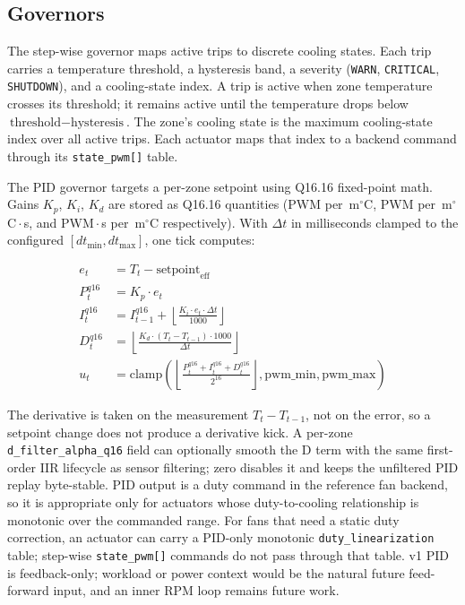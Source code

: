 \subsection{Governors}

The step-wise governor maps active trips to discrete cooling states. Each trip carries a temperature threshold, a hysteresis band, a severity (\texttt{WARN}, \texttt{CRITICAL}, \texttt{SHUTDOWN}), and a cooling-state index. A trip is active when zone temperature crosses its threshold; it remains active until the temperature drops below \(\text{threshold} - \text{hysteresis}\). The zone's cooling state is the maximum cooling-state index over all active trips. Each actuator maps that index to a backend command through its \texttt{state\_pwm[]} table.

The PID governor targets a per-zone setpoint using Q16.16 fixed-point math. Gains $K_p$, $K_i$, $K_d$ are stored as Q16.16 quantities (PWM per~m$^\circ$C, PWM per~m$^\circ$C\,$\cdot$\,s, and PWM\,$\cdot$\,s per~m$^\circ$C respectively). With \(\Delta t\) in milliseconds clamped to the configured \([dt_\text{min}, dt_\text{max}]\), one tick computes:

\begin{align}
e_t &= T_t - \text{setpoint}_\text{eff} \label{eq:pid-err}\\
P_t^{q16} &= K_p \cdot e_t \\
I_t^{q16} &= I_{t-1}^{q16} + \left\lfloor \frac{K_i \cdot e_t \cdot \Delta t}{1000} \right\rfloor \\
D_t^{q16} &= \left\lfloor \frac{K_d \cdot (T_t - T_{t-1}) \cdot 1000}{\Delta t} \right\rfloor \\
u_t &= \mathrm{clamp}\!\left(\left\lfloor\frac{P_t^{q16} + I_t^{q16} + D_t^{q16}}{2^{16}}\right\rfloor, \text{pwm\_min}, \text{pwm\_max}\right) \label{eq:pid-out}
\end{align}

The derivative is taken on the measurement \(T_t - T_{t-1}\), not on the error, so a setpoint change does not produce a derivative kick. A per-zone \texttt{d\_filter\_alpha\_q16} field can optionally smooth the D term with the same first-order IIR lifecycle as sensor filtering; zero disables it and keeps the unfiltered PID replay byte-stable. PID output is a duty command in the reference fan backend, so it is appropriate only for actuators whose duty-to-cooling relationship is monotonic over the commanded range. For fans that need a static duty correction, an actuator can carry a PID-only monotonic \texttt{duty\_linearization} table; step-wise \texttt{state\_pwm[]} commands do not pass through that table. v1 PID is feedback-only; workload or power context would be the natural future feed-forward input, and an inner RPM loop remains future work.


